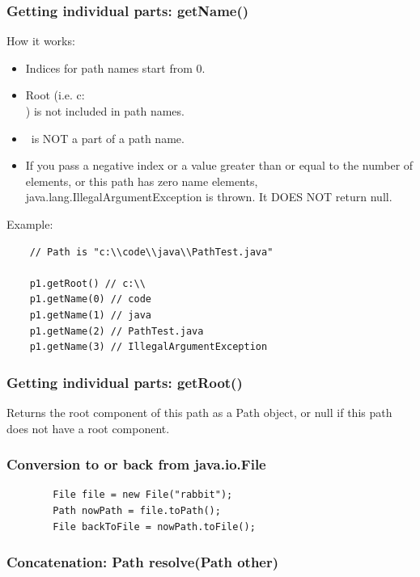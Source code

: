 \documentclass{scrartcl}
\begin{document}
 \subsubsection{Getting individual parts: getName()}

 How it works:

 \begin{itemize}
     \item Indices for path names start from 0.
     \item Root (i.e. c:\\) is not included in path names.
     \item \ is NOT a part of a path name.
     \item If you pass a negative index or a value greater than or equal to the number of elements, or this path has zero name elements, java.lang.IllegalArgumentException is thrown. It DOES NOT return null.
 \end{itemize}

 Example:

\begin{lstlisting}
    // Path is "c:\\code\\java\\PathTest.java"

    p1.getRoot() // c:\\
    p1.getName(0) // code
    p1.getName(1) // java
    p1.getName(2) // PathTest.java
    p1.getName(3) // IllegalArgumentException
\end{lstlisting}

\subsubsection{Getting individual parts: getRoot()}

Returns the root component of this path as a Path object, or null if this path does not have a root component.

\subsubsection{Conversion to or back from java.io.File}

    \begin{lstlisting}
        File file = new File("rabbit");
        Path nowPath = file.toPath();
        File backToFile = nowPath.toFile();
    \end{lstlisting}

\subsubsection{Concatenation: Path resolve(Path other)}
\end{document}
